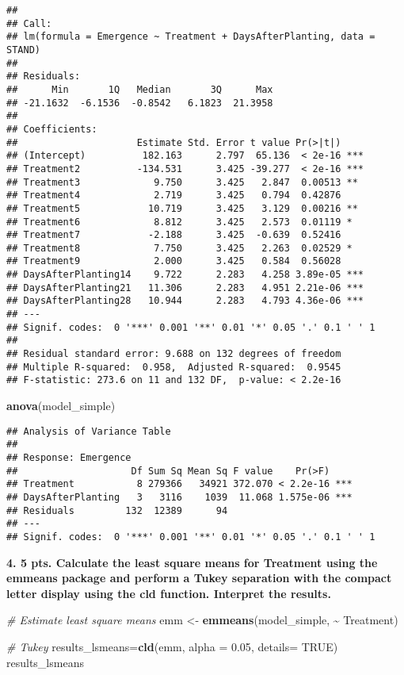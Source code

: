 \documentclass[
]{article}
\newenvironment{Shaded}{\begin{snugshade}}{\end{snugshade}}
\newcommand{\AttributeTok}[1]{\textcolor[rgb]{0.13,0.29,0.53}{#1}}
\newcommand{\CommentTok}[1]{\textcolor[rgb]{0.56,0.35,0.01}{\textit{#1}}}
\newcommand{\ConstantTok}[1]{\textcolor[rgb]{0.56,0.35,0.01}{#1}}
\newcommand{\FloatTok}[1]{\textcolor[rgb]{0.00,0.00,0.81}{#1}}
\newcommand{\FunctionTok}[1]{\textcolor[rgb]{0.13,0.29,0.53}{\textbf{#1}}}
\newcommand{\NormalTok}[1]{#1}
\newcommand{\OtherTok}[1]{\textcolor[rgb]{0.56,0.35,0.01}{#1}}
\newcommand{\SpecialCharTok}[1]{\textcolor[rgb]{0.81,0.36,0.00}{\textbf{#1}}}
\begin{document}
\begin{verbatim}
## 
## Call:
## lm(formula = Emergence ~ Treatment + DaysAfterPlanting, data = STAND)
## 
## Residuals:
##      Min       1Q   Median       3Q      Max 
## -21.1632  -6.1536  -0.8542   6.1823  21.3958 
## 
## Coefficients:
##                     Estimate Std. Error t value Pr(>|t|)    
## (Intercept)          182.163      2.797  65.136  < 2e-16 ***
## Treatment2          -134.531      3.425 -39.277  < 2e-16 ***
## Treatment3             9.750      3.425   2.847  0.00513 ** 
## Treatment4             2.719      3.425   0.794  0.42876    
## Treatment5            10.719      3.425   3.129  0.00216 ** 
## Treatment6             8.812      3.425   2.573  0.01119 *  
## Treatment7            -2.188      3.425  -0.639  0.52416    
## Treatment8             7.750      3.425   2.263  0.02529 *  
## Treatment9             2.000      3.425   0.584  0.56028    
## DaysAfterPlanting14    9.722      2.283   4.258 3.89e-05 ***
## DaysAfterPlanting21   11.306      2.283   4.951 2.21e-06 ***
## DaysAfterPlanting28   10.944      2.283   4.793 4.36e-06 ***
## ---
## Signif. codes:  0 '***' 0.001 '**' 0.01 '*' 0.05 '.' 0.1 ' ' 1
## 
## Residual standard error: 9.688 on 132 degrees of freedom
## Multiple R-squared:  0.958,  Adjusted R-squared:  0.9545 
## F-statistic: 273.6 on 11 and 132 DF,  p-value: < 2.2e-16
\end{verbatim}

\begin{Shaded}
\begin{Highlighting}[]
\FunctionTok{anova}\NormalTok{(model\_simple)}
\end{Highlighting}
\end{Shaded}

\begin{verbatim}
## Analysis of Variance Table
## 
## Response: Emergence
##                    Df Sum Sq Mean Sq F value    Pr(>F)    
## Treatment           8 279366   34921 372.070 < 2.2e-16 ***
## DaysAfterPlanting   3   3116    1039  11.068 1.575e-06 ***
## Residuals         132  12389      94                      
## ---
## Signif. codes:  0 '***' 0.001 '**' 0.01 '*' 0.05 '.' 0.1 ' ' 1
\end{verbatim}

\textbf{4. 5 pts. Calculate the least square means for Treatment using
the emmeans package and perform a Tukey separation with the compact
letter display using the cld function. Interpret the results.}

\begin{Shaded}
\begin{Highlighting}[]
\CommentTok{\# Estimate least square means}
\NormalTok{emm }\OtherTok{\textless{}{-}} \FunctionTok{emmeans}\NormalTok{(model\_simple, }\SpecialCharTok{\textasciitilde{}}\NormalTok{ Treatment)}

\CommentTok{\# Tukey }
\NormalTok{results\_lsmeans}\OtherTok{=}\FunctionTok{cld}\NormalTok{(emm, }\AttributeTok{alpha =} \FloatTok{0.05}\NormalTok{, }\AttributeTok{details=} \ConstantTok{TRUE}\NormalTok{)}
\NormalTok{results\_lsmeans}
\end{Highlighting}
\end{Shaded}
\end{document}
